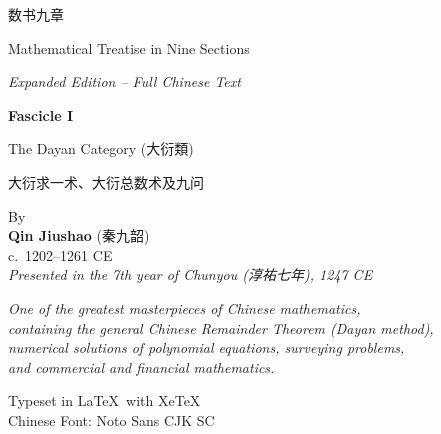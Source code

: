 \documentclass[11pt,a4paper]{article}
\newcommand{\zhtext}[1]{{\chinese #1}}
\begin{document}
\begin{titlepage}
\centering
\vspace*{2.5cm}

{\fontsize{32}{38}\selectfont\chineselg
\textcolor{titlecolor}{数书九章}}

\vspace{1cm}

{\fontsize{18}{22}\selectfont
\textcolor{sectioncolor}{Mathematical Treatise in Nine Sections}}

\vspace{0.5cm}

{\large\textit{Expanded Edition -- Full Chinese Text}}

\vspace{2cm}

{\LARGE\bfseries Fascicle I}

\vspace{0.5cm}

{\Large The Dayan Category (\zhtext{大衍類})}

\vspace{0.8cm}

{\normalsize\zhtext{大衍求一术、大衍总数术及九问}}

\vspace{2cm}

{\large By\\[0.5em]
\textbf{Qin Jiushao} (\zhtext{秦九韶})\\[0.3em]
c.\ 1202--1261 CE\\[0.5em]
\textit{Presented in the 7th year of Chunyou (\zhtext{淳祐七年}), 1247 CE}}

\vspace{1.5cm}

{\small
\textit{One of the greatest masterpieces of Chinese mathematics,\\
containing the general Chinese Remainder Theorem (Dayan method),\\
numerical solutions of polynomial equations, surveying problems,\\
and commercial and financial mathematics.}}

\vfill

{\small Typeset in \LaTeX\ with XeTeX\\
Chinese Font: Noto Sans CJK SC}

\end{titlepage}
\end{document}
